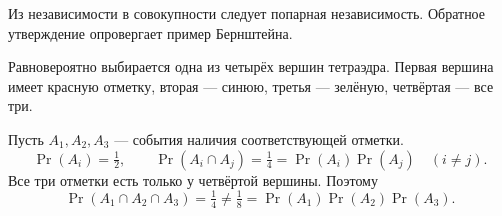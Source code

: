 Из независимости в совокупности следует попарная независимость. Обратное утверждение опровергает пример Бернштейна.
\begin{example}
Равновероятно выбирается одна из четырёх вершин тетраэдра. Первая вершина имеет красную отметку, вторая — синюю, третья — зелёную, четвёртая — все три.

\smallskip
Пусть $A_1,A_2,A_3$ — события наличия соответствующей отметки.
\[
 \Pr(A_i)=\tfrac12,\qquad
 \Pr(A_i\cap A_j)=\tfrac14=\Pr(A_i)\Pr(A_j)\quad(i\ne j).
\]
Все три отметки есть только у четвёртой вершины. Поэтому
\[
 \Pr(A_1\cap A_2\cap A_3)=\tfrac14\ne\tfrac18=\Pr(A_1)\Pr(A_2)\Pr(A_3).
\]
\end{example}


